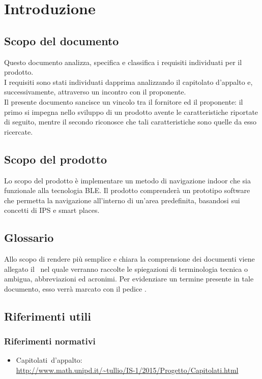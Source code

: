\documentclass[../AnalisiDeiRequisiti.tex]{subfiles}
\begin{document}
\section{Introduzione}
	\subsection{Scopo del documento}
	Questo documento analizza, specifica e classifica i requisiti individuati per il prodotto.\\
	I requisiti sono stati individuati dapprima analizzando il capitolato d’appalto e, successivamente, attraverso un incontro con il proponente.\\
	Il presente documento sancisce un vincolo tra il fornitore ed il proponente: il primo si impegna nello sviluppo di un prodotto avente le caratteristiche riportate di seguito, mentre il secondo 				riconosce che tali caratteristiche sono quelle da esso ricercate.

	\subsection{Scopo del prodotto}
	Lo scopo del prodotto è implementare un metodo di navigazione indoor che sia funzionale alla tecnologia BLE. Il prodotto comprenderà un prototipo software che permetta la navigazione all’interno di un’area predefinita, basandosi sui concetti di IPS e smart places.
	
	\subsection{Glossario} 
	Allo scopo di rendere più semplice e chiara la comprensione dei documenti viene allegato il \glossariov\ nel quale verranno raccolte le spiegazioni di  terminologia tecnica o  ambigua,
abbreviazioni ed acronimi. Per evidenziare un termine presente in tale documento, esso verrà marcato con il pedice \g.
	
	\subsection{Riferimenti utili}
		\subsubsection{Riferimenti normativi}
		\begin{itemize}
			\item Capitolati\g\ d'appalto: \\\url{http://www.math.unipd.it/~tullio/IS-1/2015/Progetto/Capitolati.html}
		\end{itemize}
\end{document}
